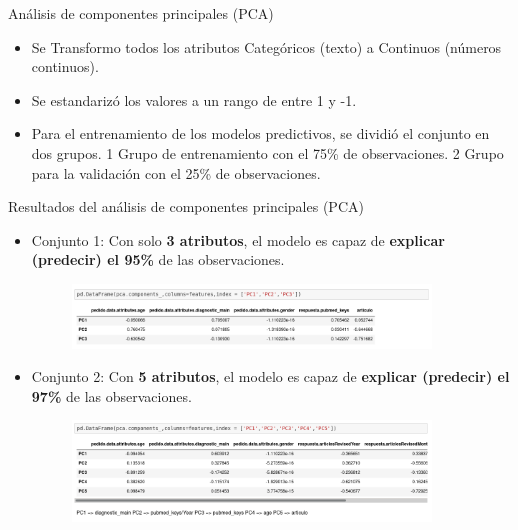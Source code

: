 \documentclass[10pt]{beamer}
\begin{document}
\begin{frame}{Análisis de componentes principales (PCA)}
  \begin{itemize}
  	\item Se Transformo todos los atributos Categóricos (texto) a Continuos (números continuos).
  	\item Se estandarizó los valores a un rango de entre 1 y -1.
  	\item Para el entrenamiento de los modelos predictivos, se dividió el conjunto en dos grupos. 1 Grupo de entrenamiento con el 75\% de observaciones. 2 Grupo para la validación con el 25\% de observaciones.
  \end{itemize}
  \note{}
\end{frame}

\begin{frame}{Resultados del análisis de componentes principales (PCA)}
  \begin{itemize}
  	\item Conjunto 1: Con solo \textbf{3 atributos}, el modelo es capaz de \textbf{explicar (predecir) el 95\%} de las observaciones.
    \begin{figure}[!htb]
      \centering
      \includegraphics[width=0.9\textwidth]{images/resultados_procesado_de_datos_pca1_atributos.png}
    \end{figure}
    \item Conjunto 2: Con \textbf{5 atributos}, el modelo es capaz de \textbf{explicar (predecir) el 97\%} de las observaciones.
    \begin{figure}[!htb]
      \centering
      \includegraphics[width=0.9\textwidth]{images/resultados_procesado_de_datos_pca2_atributos.png}
    \end{figure}
  \end{itemize}	
\end{frame}
\end{document}
